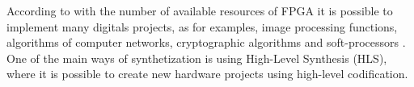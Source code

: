       According to with the number of available resources of FPGA it is possible to implement many digitals projects, as for examples, image processing functions, algorithms of computer networks, cryptographic algorithms and soft-processors \cite{Plessl2003, Choi2016}.
      One of the main ways of synthetization is using High-Level Synthesis (HLS), where it is possible to create new hardware projects using high-level codification.